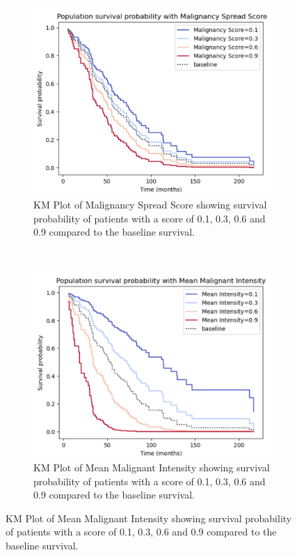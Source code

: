 \documentclass{l4proj}
\begin{document}
\begin{figure}[h]
    \centering
    \begin{subfigure}[b]{0.45\textwidth}
        \includegraphics[scale=0.3]{images/binary-km.png}
        \caption{KM Plot of Malignancy Spread Score showing survival probability of patients with a score of 0.1, 0.3, 0.6 and 0.9 compared to the baseline survival. }
        \label{fig:binary-map}
    \end{subfigure}\hfill%
    ~
    \begin{subfigure}[b]{0.45\textwidth}
        \includegraphics[scale=0.32]{images/continuous_km.png}
        \caption{KM Plot of Mean Malignant Intensity showing survival probability of patients with a score of 0.1, 0.3, 0.6 and 0.9 compared to the baseline survival.}
        \label{fig:continuous-heatmap}
    \end{subfigure}


\end{figure}
\end{document}
